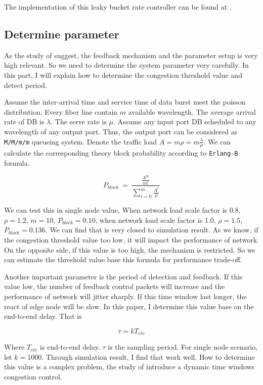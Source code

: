 The implementation of this leaky bucket rate controller can be found at \cite{ref:leaky-bucket}. 

\subsection{Determine parameter}

As the study of \cite{ref:feedback-based} suggest, the feedback mechanism and the parameter setup is very high relevant. So we need to determine the system parameter very carefully. In this part, I will explain how to determine the congestion threshold value and detect period.

Assume the inter-arrival time and service time of data burst meet the poisson distribution. Every fiber line contain $m$ available wavelength. The average arrival rate of DB is $\lambda$. The serve rate is $\mu$. Assume any input port DB scheduled to any wavelength of any output port. Thus, the output port can be considered as \verb|M/M/m/m| queueing system. Denote the traffic load $A=m\rho=m\frac{\lambda}{\mu}$. We can calculate the corresponding theory block probability according to
\verb|Erlang-B| formula. 

$$
    P_{block} ~=~ \frac{\frac{A^m}{m!}}{\sum_{i=0}^{m}\frac{A^i}{i!}}
$$

We can test this in single node value, When network load scale factor is 0.8, $\rho=1.2$, $m=10$, $P_{block} = 0.10$, when network load scale factor is 1.0, $\rho=1.5$, $P_{block} = 0.136$. We can find that is very closed to simulation result. As we know, if the congestion threshold value too low, it will impact the performance of network. On the opposite side, if this value is too high, the mechanism is restricted. So we can estimate the threshold value base this formula for
performance trade-off.  

Another important parameter is the period of detection and feedback. If this value low, the number of feedback control packets will increase and the performance of network will jitter sharply. If this time window last longer, the react of edge node will be slow. In this paper, I determine this value base on the end-to-end delay. That is 

$$ \tau = kT_{ete} $$

Where $T_{ete}$ is end-to-end delay. $\tau$ is the sampling period. For single node scenario, let $k=1000$. Through simulation result, I find that work well. How to determine this value is a complex problem, the study of \cite{ref:time-window} introduce a dynamic time windows congestion control.
